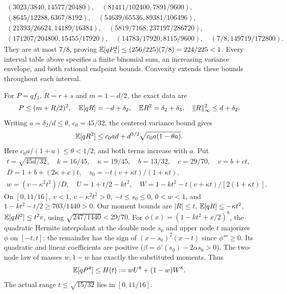 \begin{gather*}
 (3023/3840,14577/20480),\quad(81411/102400,7891/9600),\\
 (8645/12288,6367/8192),\quad(54639/65536,89381/106496),\\
 (21393/26624,14189/16384),\quad(5819/7168,237197/286720),\\
 (171207/204800,15455/17920),\quad(14783/17920,8115/9600),\quad
 (7/8,149719/172800).
\end{gather*}
They are at most $7/8$, proving $\mathbb E[qP_5^4]\le(256/225)(7/8)=224/225<1$.
Every interval table above specifies a finite binomial sum, an increasing
variance envelope, and both rational endpoint bounds. Convexity extends these bounds throughout each interval.

For $P=qf_3$, $R=r+s$ and $m=1-d/2$, the exact data are
\[
 P\le(m+R/2)^2,\quad \mathbb E[qR]=-d+\delta_{2},\quad
 \mathbb E R^2=\delta_{2}+\delta_{3},\quad \|R\|_\infty^2\le d+\delta_{2}.
\]
Writing $a=\delta_{2}/d\le\theta$, $c_0=45/32$, the centered variance bound gives
\[
 \mathbb E[qR^2]\le c_0ad+d^{3/2}\sqrt{c_0a(1-\theta a)}.
\]
Here $c_0a/(1+a)\le\theta<1/2$, and both terms increase with $a$.
Put
\begin{gather*}
 t=\sqrt{45d/32},\quad k=16/45,\quad\kappa=19/45,\quad
 b=13/32,\quad c=29/70,\quad v=b+ct,\\
 D=1+b+(2\kappa+c)t,\quad s_0=-t(v+\kappa t)/(1+\kappa t),\\
 w=(v-\kappa^2t^2)/D,\quad U=1+t/2-kt^2,\quad
 W=1-kt^2-t(v+\kappa t)/[2(1+\kappa t)].
\end{gather*}
On $[0,11/16]$, $v<1$, $v-\kappa^2t^2>0$, $-t\le s_0\le0$,
$0<w<1$, and $1-kt^2-t/2\ge703/1440>0$.
Our moment bounds are $|R|\le t$, $\mathbb E[qR]\le-\kappa t^2$,
$\mathbb E[qR^2]\le t^2v$, using $\sqrt{247/1440}<29/70$.
For $\phi(x)=(1-kt^2+x/2)^8$, the quadratic Hermite interpolant at
the double node $s_0$ and upper node $t$ majorizes $\phi$ on $[-t,t]$:
the remainder has the sign of $(x-s_0)^2(x-t)$ since $\phi'''\ge0$.
Its quadratic and linear coefficients are positive
($\beta=\phi'(s_0)-2\alpha s_0>0$).
The two-node law of masses $w,1-w$ has exactly the substituted moments.
Thus
\[
 \mathbb E[qP^4]\le H(t):=wU^8+(1-w)W^8.
\]
The actual range $t\le\sqrt{15/32}$ lies in $[0,11/16]$.

